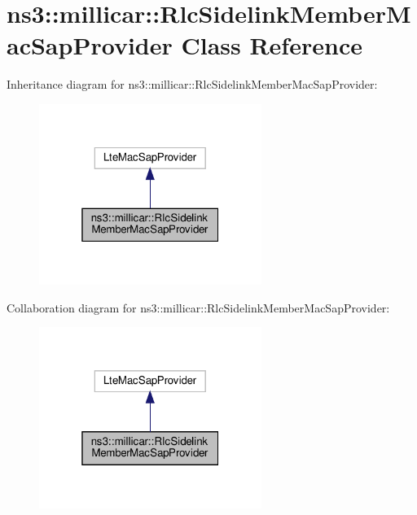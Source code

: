 \hypertarget{classns3_1_1millicar_1_1RlcSidelinkMemberMacSapProvider}{}\section{ns3\+:\+:millicar\+:\+:Rlc\+Sidelink\+Member\+Mac\+Sap\+Provider Class Reference}
\label{classns3_1_1millicar_1_1RlcSidelinkMemberMacSapProvider}


Inheritance diagram for ns3\+:\+:millicar\+:\+:Rlc\+Sidelink\+Member\+Mac\+Sap\+Provider\+:
\nopagebreak
\begin{figure}[H]
\begin{center}
\leavevmode
\includegraphics[width=205pt]{classns3_1_1millicar_1_1RlcSidelinkMemberMacSapProvider__inherit__graph}
\end{center}
\end{figure}


Collaboration diagram for ns3\+:\+:millicar\+:\+:Rlc\+Sidelink\+Member\+Mac\+Sap\+Provider\+:
\nopagebreak
\begin{figure}[H]
\begin{center}
\leavevmode
\includegraphics[width=205pt]{classns3_1_1millicar_1_1RlcSidelinkMemberMacSapProvider__coll__graph}
\end{center}
\end{figure}
